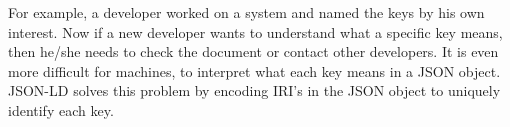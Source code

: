 		For example, a developer worked on a system and named the keys by his own interest. Now if a new developer wants to understand what a specific key means, then he/she needs to check the document or contact other developers. It is even more difficult for machines, to interpret what each key means in a JSON object. JSON-LD solves this problem by encoding IRI's in the JSON object to uniquely identify each key.
		
		
	

